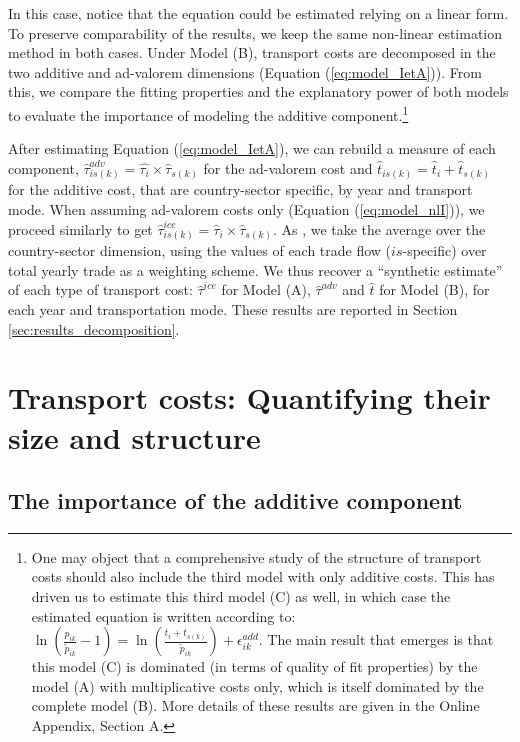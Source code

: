 \documentclass[a4paper,11pt]{article}
\begin{document}
In this case, notice that the equation could be estimated relying on a linear form. To preserve comparability of the results, we keep the same non-linear estimation method in both cases. Under Model (B), transport costs are decomposed in the two additive and ad-valorem dimensions (Equation (\ref{eq:model_IetA})).
From this, we compare the fitting properties and the explanatory power of both models to evaluate the importance of modeling the additive component.\footnote{One may object that a comprehensive study of the structure of transport costs should also include the third model with only additive costs. This has driven us to estimate this third model (C) as well, in which case the estimated equation is written according to: $\ln\left(\frac{p_{ik}}{\widetilde{p}_{ik}}-1 \right)= \ln \left(\frac{t_{i} + t_{s(k)}}{\widetilde{p}_{ik}}\right) + \epsilon^{add}_{ik}$.
The main result that emerges is that this model (C) is dominated (in terms of quality of fit properties) by the model (A) with multiplicative costs only, which is itself dominated by the complete model (B). More details of these results are given in the Online Appendix, Section A.} 

After estimating Equation (\ref{eq:model_IetA}), we can rebuild a measure of each component, $\widehat{\tau}^{adv}_{is(k)} = \widehat{\tau_{i}} \times \widehat{\tau}_{s(k)}$ for the ad-valorem cost and $\widehat{t}_{is(k)} = \widehat{t}_{i} + \widehat{t}_{s(k)}$ for the additive cost, that are country-sector specific, by year and transport mode.
When assuming ad-valorem costs only (Equation (\ref{eq:model_nlI})), we proceed similarly to get $\widehat{\tau}^{ice}_{is(k)} = \widehat{\tau}_{i} \times \widehat{\tau}_{s(k)}$.
As \cite{Irrazabal_2015}, we take the average over the country-sector dimension, using the values of each trade flow ($is$-specific) over total yearly trade as a weighting scheme.
We thus recover a ``synthetic estimate'' of each type of transport cost: $\widehat{\tau}^{ice}$ for Model (A), $\widehat{\tau}^{adv}$ and $\widehat{t}$ for Model (B), for each year and transportation mode. These results are reported in Section \ref{sec:results_decomposition}.


\section{Transport costs: Quantifying their size and structure}\label{sec:basic_results}

\subsection{The importance of the additive component \label{sec:results_decomposition}}
\end{document}
